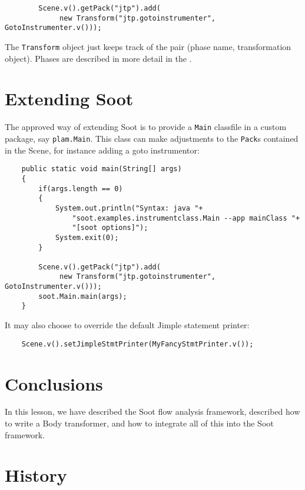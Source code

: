 \documentclass{article}
\begin{document}
\begin{verbatim}
        Scene.v().getPack("jtp").add(
             new Transform("jtp.gotoinstrumenter", GotoInstrumenter.v()));
\end{verbatim}

The {\tt Transform} object just keeps track of the pair (phase name,
transformation object).  Phases are described in more detail in the
.

\section{Extending Soot}

The approved way of extending Soot is to provide a {\tt Main} classfile
in a custom package, say {\tt plam.Main}.  This class can make adjustments
to the {\tt Pack}s contained in the Scene, for instance adding a
goto instrumentor:

\begin{verbatim}
    public static void main(String[] args) 
    {
        if(args.length == 0)
        {
            System.out.println("Syntax: java "+
                "soot.examples.instrumentclass.Main --app mainClass "+
                "[soot options]");
            System.exit(0);
        }            
        
        Scene.v().getPack("jtp").add(
             new Transform("jtp.gotoinstrumenter", GotoInstrumenter.v()));
        soot.Main.main(args);
    }
\end{verbatim}

It may also choose to override the default Jimple statement printer:
\begin{verbatim}
    Scene.v().setJimpleStmtPrinter(MyFancyStmtPrinter.v());
\end{verbatim}

\section{Conclusions}

In this lesson, we have described the Soot flow analysis framework,
described how to write a Body transformer, and how to integrate all of
this into the Soot framework.

\section{History}
\end{document}
